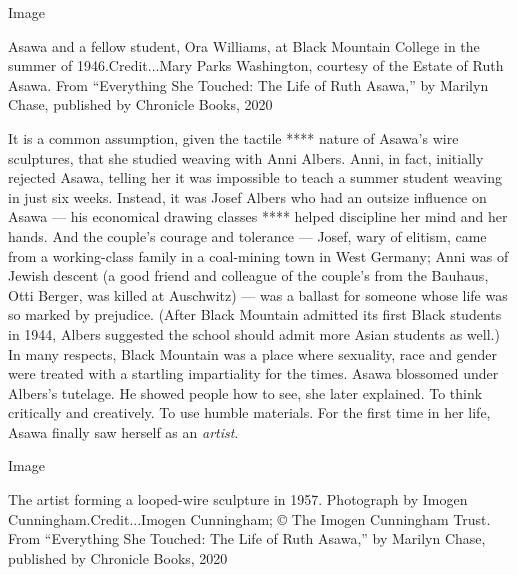 Image

Asawa and a fellow student, Ora Williams, at Black Mountain College in
the summer of 1946.Credit...Mary Parks Washington, courtesy of the
Estate of Ruth Asawa. From ``Everything She Touched: The Life of Ruth
Asawa,'' by Marilyn Chase, published by Chronicle Books, 2020

It is a common assumption, given the tactile **** nature of Asawa's wire
sculptures, that she studied weaving with Anni Albers. Anni, in fact,
initially rejected Asawa, telling her it was impossible to teach a
summer student weaving in just six weeks. Instead, it was Josef Albers
who had an outsize influence on Asawa --- his economical drawing classes
**** helped discipline her mind and her hands. And the couple's courage
and tolerance --- Josef, wary of elitism, came from a working-class
family in a coal-mining town in West Germany; Anni was of Jewish descent
(a good friend and colleague of the couple's from the Bauhaus, Otti
Berger, was killed at Auschwitz) --- was a ballast for someone whose
life was so marked by prejudice. (After Black Mountain admitted its
first Black students in 1944, Albers suggested the school should admit
more Asian students as well.) In many respects, Black Mountain was a
place where sexuality, race and gender were treated with a startling
impartiality for the times. Asawa blossomed under Albers's tutelage. He
showed people how to see, she later explained. To think critically and
creatively. To use humble materials. For the first time in her life,
Asawa finally saw herself as an \emph{artist}.

Image

The artist forming a looped-wire sculpture in 1957. Photograph by Imogen
Cunningham.Credit...Imogen Cunningham; © The Imogen Cunningham Trust.
From ``Everything She Touched: The Life of Ruth Asawa,'' by Marilyn
Chase, published by Chronicle Books, 2020

